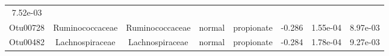 \documentclass[11pt,]{article}
\begin{document}
\begin{longtable}[]{@{}cccccccc@{}}
\begin{minipage}[t]{0.08\columnwidth}
7.52e-03\strut
\end{minipage}\tabularnewline
\begin{minipage}[t]{0.08\columnwidth}\centering\strut
Otu00728\strut
\end{minipage} & \begin{minipage}[t]{0.15\columnwidth}\centering\strut
Ruminococcaceae\strut
\end{minipage} & \begin{minipage}[t]{0.15\columnwidth}\centering\strut
Ruminococcaceae\strut
\end{minipage} & \begin{minipage}[t]{0.08\columnwidth}\centering\strut
normal\strut
\end{minipage} & \begin{minipage}[t]{0.09\columnwidth}\centering\strut
propionate\strut
\end{minipage} & \begin{minipage}[t]{0.07\columnwidth}\centering\strut
-0.286\strut
\end{minipage} & \begin{minipage}[t]{0.08\columnwidth}\centering\strut
1.55e-04\strut
\end{minipage} & \begin{minipage}[t]{0.08\columnwidth}\centering\strut
8.97e-03\strut
\end{minipage}\tabularnewline
\begin{minipage}[t]{0.08\columnwidth}\centering\strut
Otu00482\strut
\end{minipage} & \begin{minipage}[t]{0.15\columnwidth}\centering\strut
Lachnospiraceae\strut
\end{minipage} & \begin{minipage}[t]{0.15\columnwidth}\centering\strut
Lachnospiraceae\strut
\end{minipage} & \begin{minipage}[t]{0.08\columnwidth}\centering\strut
normal\strut
\end{minipage} & \begin{minipage}[t]{0.09\columnwidth}\centering\strut
propionate\strut
\end{minipage} & \begin{minipage}[t]{0.07\columnwidth}\centering\strut
-0.284\strut
\end{minipage} & \begin{minipage}[t]{0.08\columnwidth}\centering\strut
1.78e-04\strut
\end{minipage} & \begin{minipage}[t]{0.08\columnwidth}\centering\strut
9.27e-03\strut
\end{minipage}\tabularnewline
\bottomrule
\end{longtable}
\end{document}
